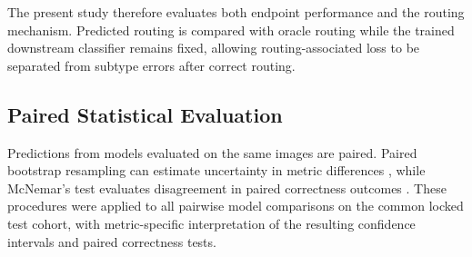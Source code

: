 The present study therefore evaluates both endpoint performance and the
routing mechanism. Predicted routing is compared with oracle routing while the
trained downstream classifier remains fixed, allowing routing-associated loss
to be separated from subtype errors after correct routing.

\subsection{Paired Statistical Evaluation}

Predictions from models evaluated on the same images are paired. Paired
bootstrap resampling can estimate uncertainty in metric differences
\cite{efron1993bootstrap}, while McNemar's test evaluates disagreement in
paired correctness outcomes \cite{mcnemar1947sampling}. These procedures were applied to all pairwise model comparisons on the
common locked test cohort, with metric-specific interpretation of the
resulting confidence intervals and paired correctness tests.
